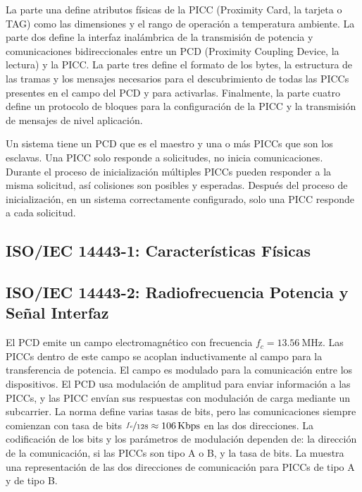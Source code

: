 \documentclass[a4paper, twoside, 11pt]{report}
\begin{document}
La parte una define atributos físicas de la PICC (Proximity Card, la tarjeta o TAG) como las dimensiones y el rango de operación a temperatura ambiente. La parte dos define la interfaz inalámbrica de la transmisión de potencia y comunicaciones bidireccionales entre un PCD (Proximity Coupling Device, la lectura) y la PICC. La parte tres define el formato de los bytes, la estructura de las tramas y los mensajes necesarios para el descubrimiento de todas las PICCs presentes en el campo del PCD y para activarlas. Finalmente, la parte cuatro define un protocolo de bloques para la configuración de la PICC y la transmisión de mensajes de nivel aplicación.

Un sistema tiene un PCD que es el maestro y una o más PICCs que son los esclavas. Una PICC solo responde a solicitudes, no inicia comunicaciones. Durante el proceso de inicialización múltiples PICCs pueden responder a la misma solicitud, así colisiones son posibles y esperadas. Después del proceso de inicialización, en un sistema correctamente configurado, solo una PICC responde a cada solicitud.

\FloatBarrier
\subsection{ISO/IEC 14443-1: \large{Características Físicas}}


\FloatBarrier
\subsection{ISO/IEC 14443-2: \large{Radiofrecuencia Potencia y Señal Interfaz}}

El PCD emite un campo electromagnético con frecuencia $f_c = \SI{13.56}{\mega\hertz}$. Las PICCs dentro de este campo se acoplan inductivamente al campo para la transferencia de potencia. El campo es modulado para la comunicación entre los dispositivos. El PCD usa modulación de amplitud para enviar información a las PICCs, y las PICC envían sus respuestas con modulación de carga mediante un subcarrier. La norma define varias tasas de bits, pero las comunicaciones siempre comienzan con tasa de bits $\nicefrac{f_c}{128} \approx \SI{106}{Kbps}$ en las dos direcciones. La codificación de los bits y los parámetros de modulación dependen de: la dirección de la comunicación, si las PICCs son tipo A o B, y la tasa de bits. La  muestra una representación de las dos direcciones de comunicación para PICCs de tipo A y de tipo B.
\end{document}
